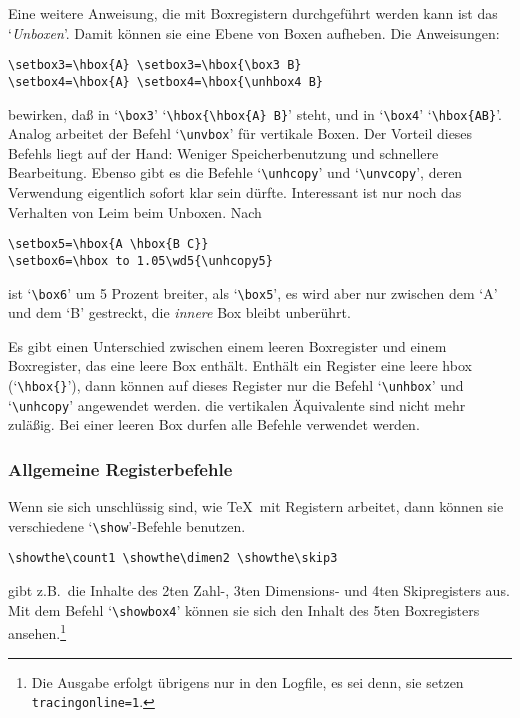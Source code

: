 Eine weitere Anweisung, die mit 
Boxregistern durchgef\"uhrt werden kann
ist das `{\em Unboxen}'. Damit k\"onnen sie eine 
Ebene von Boxen aufheben. Die Anweisungen:
\begin{verbatim}
\setbox3=\hbox{A} \setbox3=\hbox{\box3 B}
\setbox4=\hbox{A} \setbox4=\hbox{\unhbox4 B}
\end{verbatim}
bewirken, da\ss{} in `\verb|\box3|' `\verb|\hbox{\hbox{A} B}|' steht, und
in `\verb|\box4|' `\verb|\hbox{AB}|'. Analog arbeitet der Befehl
`\verb|\unvbox|' f\"ur vertikale Boxen. Der Vorteil dieses Befehls liegt
auf der Hand: Weniger 
Speicherbenutzung und schnellere Bearbeitung.
Ebenso gibt es die Befehle
`\verb|\unhcopy|' und `\verb|\unvcopy|',
deren Verwendung eigentlich sofort klar sein d\"urfte. Interessant ist
nur noch das Verhalten von Leim beim Unboxen. Nach
\begin{verbatim}
\setbox5=\hbox{A \hbox{B C}}
\setbox6=\hbox to 1.05\wd5{\unhcopy5}
\end{verbatim}
ist `\verb|\box6|' um 5 
Prozent breiter, als `\verb|\box5|', es wird
aber nur zwischen dem `A' und dem `B' gestreckt, die {\em innere} Box
bleibt unber\"uhrt.

Es gibt einen Unterschied zwischen einem leeren Boxregister und einem
Boxregister, das eine leere Box enth\"alt. Enth\"alt ein Register eine
leere hbox (`\verb|\hbox{}|'), dann k\"onnen auf dieses Register nur die
Befehl 
`\verb|\unhbox|' und `\verb|\unhcopy|' angewendet werden. die
vertikalen \"Aquivalente sind nicht mehr zul\"a\ss{}ig. Bei einer
leeren Box
durfen alle Befehle verwendet werden.

\subsubsection{Allgemeine Registerbefehle}
Wenn sie sich unschl\"ussig sind, wie \TeX\ mit Registern arbeitet, dann
k\"onnen sie verschiedene `\verb|\show|'-Befehle benutzen.
\begin{verbatim}
\showthe\count1 \showthe\dimen2 \showthe\skip3
\end{verbatim}
gibt z.B.\ die Inhalte des 2ten Zahl-, 3ten 
Dimensions- und 4ten
Skipregisters aus. Mit dem Befehl 
`\verb|\showbox4|' k\"onnen sie sich den Inhalt
des 5ten Boxregisters ansehen.\footnote{Die Ausgabe erfolgt \"ubrigens
nur in den Logfile, es sei denn, sie setzen {\tt{}
tracingonline=1}.}

